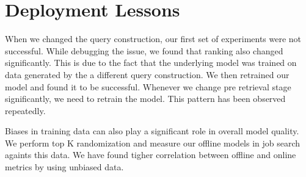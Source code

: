 \section{Deployment Lessons}

When we changed the query construction, our first set of experiments were not
successful. While debugging the issue, we found that ranking also changed
significantly. This is due to the fact that the underlying model was trained on
data generated by the a different query construction. We then retrained our
model and found it to be successful. Whenever we change pre retrieval stage
significantly, we need to retrain the model. This pattern has been observed
repeatedly.

Biases in training data can also play a significant role in overall model
quality. We perform top K randomization and measure our offline models in job
search againts this data. We have found tigher correlation between offline and
online metrics by using unbiased data.
